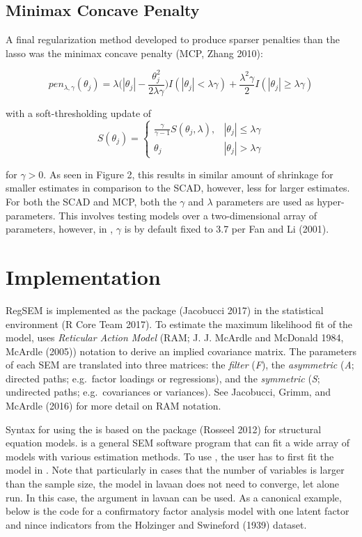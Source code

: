 \documentclass[article]{jss}
\begin{document}
\subsection{Minimax Concave Penalty}\label{minimax-concave-penalty}

A final regularization method developed to produce sparser penalties
than the lasso was the minimax concave penalty (MCP, Zhang 2010):

\[
pen_{\lambda,\gamma}(\theta_{j}) = \lambda\bigg(|\theta_{j}|-\frac{\theta_{j}^{2}}{2\lambda\gamma}\bigg)I(|\theta_{j}|<\lambda\gamma) +\frac{\lambda^{2}\gamma}{2}I(|\theta_{j}|\geq \lambda\gamma)
\]

with a soft-thresholding update of \[
S(\theta_{j})= 
\begin{cases}
\frac{\gamma}{\gamma-1}S(\theta_{j},\lambda),&  |\theta_{j}| \leq \lambda\gamma\\
\theta_{j} & |\theta_{j}| > \lambda \gamma
\end{cases}
\]

for \(\gamma > 0\). As seen in Figure 2, this results in similar amount
of shrinkage for smaller estimates in comparison to the SCAD, however,
less for larger estimates. For both the SCAD and MCP, both the
\(\gamma\) and \(\lambda\) parameters are used as hyper-parameters. This
involves testing models over a two-dimensional array of parameters,
however, in , \(\gamma\) is by default fixed to 3.7 per Fan
and Li (2001).

\section{Implementation}\label{implementation}

RegSEM is implemented as the  package (Jacobucci 2017) in
the  statistical environment (R Core Team 2017). To estimate
the maximum likelihood fit of the model,  uses
\textit{Reticular Action Model} (RAM; J. J. McArdle and McDonald 1984,
McArdle (2005)) notation to derive an implied covariance matrix. The
parameters of each SEM are translated into three matrices: the
\textit{filter} (\textit{F}), the \textit{asymmetric} (\textit{A};
directed paths; e.g.~factor loadings or regressions), and the
\textit{symmetric} (\textit{S}; undirected paths; e.g.~covariances or
variances). See Jacobucci, Grimm, and McArdle (2016) for more detail on
RAM notation.

Syntax for using the  is based on the  package
(Rosseel 2012) for structural equation models.  is a general
SEM software program that can fit a wide array of models with various
estimation methods. To use , the user has to first fit the
model in . Note that particularly in cases that the number
of variables is larger than the sample size, the model in lavaan does
not need to converge, let alone run. In this case, the
 argument in lavaan can be used. As a canonical
example, below is the code for a confirmatory factor analysis model with
one latent factor and nince indicators from the Holzinger and Swineford
(1939) dataset.
\end{document}
